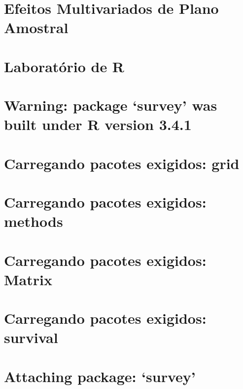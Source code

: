 \documentclass[]{book}
\theoremstyle{definition}
\theoremstyle{definition}
\theoremstyle{definition}
\theoremstyle{remark}
\begin{document}
\section{Efeitos Multivariados de Plano
Amostral}\label{efeitos-multivariados-de-plano-amostral}

\section{Laboratório de R}\label{laboratorio-de-r-1}

\section{\texorpdfstring{Warning: package `survey' was built under R
version
3.4.1}{Warning: package survey was built under R version 3.4.1}}\label{warning-package-survey-was-built-under-r-version-3.4.1}

\section{Carregando pacotes exigidos:
grid}\label{carregando-pacotes-exigidos-grid}

\section{Carregando pacotes exigidos:
methods}\label{carregando-pacotes-exigidos-methods}

\section{Carregando pacotes exigidos:
Matrix}\label{carregando-pacotes-exigidos-matrix}

\section{Carregando pacotes exigidos:
survival}\label{carregando-pacotes-exigidos-survival}

\section{}\label{section-19}

\section{\texorpdfstring{Attaching package:
`survey'}{Attaching package: survey}}\label{attaching-package-survey}
\end{document}
